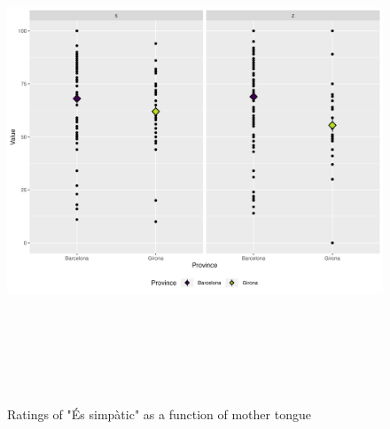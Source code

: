 \documentclass[
  a4paper,
  11pt,
  twocolumn]{article}
\begin{document}
\begin{figure}[!ht]
\begin{center}
\includegraphics[height=15cm]{./includes/figures/simpatic.png}
\caption{Ratings of "És simpàtic" as a function of mother tongue}\label{fig:simpatic}
\end{center}
\end{figure}
\end{document}
